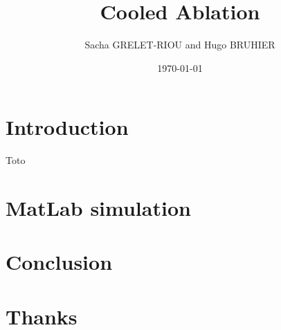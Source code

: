\documentclass[11pt]{beamer}
\author{Sacha GRELET-RIOU and Hugo BRUHIER}
\title{Cooled Ablation}
\institute{Télécom Saint-Étienne}
\date{\today}
\begin{document}
\begin{frame}
\titlepage
\end{frame}

\begin{frame}
\tableofcontents
\end{frame}

\section{Introduction}
\begin{frame}{Toto}

\end{frame}

\section{MatLab simulation}

\begin{frame}

\end{frame}

\section{Conclusion}

\begin{frame}

\end{frame}

\section*{Thanks}
\end{document}
